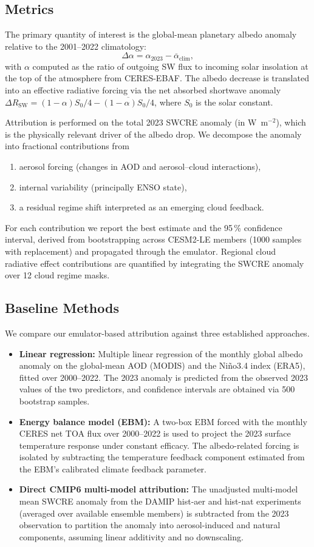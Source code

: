 \documentclass{article}
\begin{document}
\subsection{Metrics}
The primary quantity of interest is the global-mean planetary albedo anomaly relative to the 2001--2022 climatology:
\[
\Delta\alpha = \alpha_{2023} - \overline{\alpha}_{\text{clim}},
\]
with $\alpha$ computed as the ratio of outgoing SW flux to incoming solar insolation at the top of the atmosphere from CERES-EBAF. The albedo decrease is translated into an effective radiative forcing via the net absorbed shortwave anomaly $\Delta R_{\text{SW}} = (1 - \alpha) S_0/4 - \overline{(1 - \alpha) S_0/4}$, where $S_0$ is the solar constant.

Attribution is performed on the total 2023 SWCRE anomaly (in W~m$^{-2}$), which is the physically relevant driver of the albedo drop. We decompose the anomaly into fractional contributions from
\begin{enumerate}
    \item aerosol forcing (changes in AOD and aerosol--cloud interactions),
    \item internal variability (principally ENSO state),
    \item a residual regime shift interpreted as an emerging cloud feedback.
\end{enumerate}
For each contribution we report the best estimate and the 95\,\% confidence interval, derived from bootstrapping across CESM2-LE members (1000 samples with replacement) and propagated through the emulator. Regional cloud radiative effect contributions are quantified by integrating the SWCRE anomaly over 12 cloud regime masks.

\subsection{Baseline Methods}
We compare our emulator-based attribution against three established approaches.
\begin{itemize}
    \item \textbf{Linear regression:} Multiple linear regression of the monthly global albedo anomaly on the global-mean AOD (MODIS) and the Ni\~no3.4 index (ERA5), fitted over 2000--2022. The 2023 anomaly is predicted from the observed 2023 values of the two predictors, and confidence intervals are obtained via 500 bootstrap samples.
    \item \textbf{Energy balance model (EBM):} A two-box EBM forced with the monthly CERES net TOA flux over 2000--2022 is used to project the 2023 surface temperature response under constant efficacy. The albedo-related forcing is isolated by subtracting the temperature feedback component estimated from the EBM's calibrated climate feedback parameter.
    \item \textbf{Direct CMIP6 multi-model attribution:} The unadjusted multi-model mean SWCRE anomaly from the DAMIP hist-aer and hist-nat experiments (averaged over available ensemble members) is subtracted from the 2023 observation to partition the anomaly into aerosol-induced and natural components, assuming linear additivity and no downscaling.
\end{itemize}
\end{document}
